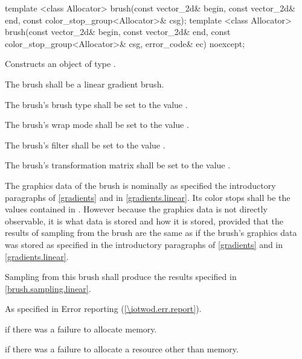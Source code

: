 \begin{itemdecl}
template <class Allocator>
brush(const vector_2d& begin, const vector_2d& end,
  const color_stop_group<Allocator>& csg);
template <class Allocator>
brush(const vector_2d& begin, const vector_2d& end,
  const color_stop_group<Allocator>& csg, error_code& ec) noexcept;
\end{itemdecl}
\begin{itemdescr}
\pnum
\effects
Constructs an object of type .

\pnum
The brush shall be a linear gradient brush.

\pnum
The brush's brush type shall be set to the value .

\pnum
The brush's wrap mode shall be set to the value .

\pnum
The brush's filter shall be set to the value .

\pnum
The brush's transformation matrix shall be set to the value .

\pnum
The graphics data of the brush is nominally as specified the introductory paragraphs of \ref{gradients} and in \ref{gradients.linear}. Its color stops shall be the values contained in . However because the graphics data is not directly observable, it is \unspecnorm what data is stored and how it is stored, provided that the results of sampling from the brush are the same as if the brush's graphics data was stored as specified in the introductory paragraphs of \ref{gradients} and in \ref{gradients.linear}.

\pnum
\remarks
Sampling from this brush shall produce the results specified in \ref{brush.sampling.linear}.

\pnum
\throws
As specified in Error reporting (\ref{\iotwod.err.report}).

\pnum
\errors
{} if there was a failure to allocate memory.

 if there was a failure to allocate a resource other than memory.
\end{itemdescr}

